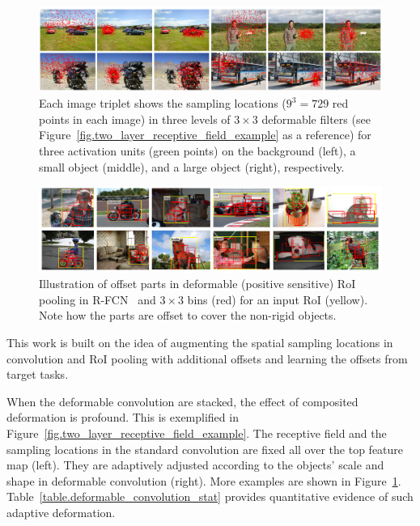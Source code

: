 \documentclass[10pt,twocolumn,letterpaper]{article}
\begin{document}
\begin{figure}
\centering
\includegraphics[width=\linewidth]{demo_of_deform_conv_v2.pdf}
\caption{Each image triplet shows the sampling locations ($9^3=729$ red points in each image) in three levels of $3\times 3$ deformable filters (see Figure~\ref{fig.two_layer_receptive_field_example} as a reference) for three activation units (green points) on the background (left), a small object (middle), and a large object (right), respectively.}
\label{fig.deform_conv_example}
\end{figure}

\begin{figure}
\centering
\includegraphics[width=\linewidth]{demo_of_deform_pool_v4.pdf}
\caption{Illustration of offset parts in deformable (positive sensitive) RoI pooling in R-FCN~\cite{dai2016rfcn} and $3\times 3$ bins (red) for an input RoI (yellow). Note how the parts are offset to cover the non-rigid objects.}
\label{fig.deform_pool_example}
\end{figure}

This work is built on the idea of augmenting the spatial sampling locations in convolution and RoI pooling with additional offsets and learning the offsets from target tasks. 

When the deformable convolution are stacked, the effect of composited deformation is profound. This is exemplified in Figure~\ref{fig.two_layer_receptive_field_example}. The receptive field and the sampling locations in the standard convolution are fixed all over the top feature map (left). They are adaptively adjusted according to the objects' scale and shape in deformable convolution (right). More examples are shown in Figure~\ref{fig.deform_conv_example}. Table~\ref{table.deformable_convolution_stat} provides quantitative evidence of such adaptive deformation.
\end{document}

